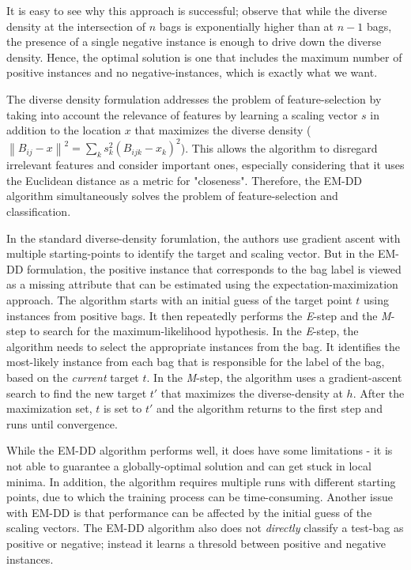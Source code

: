 \documentclass[conference]{IEEEtran}
\begin{document}
It is easy to see why this approach is successful; observe that while the diverse density at the intersection of $n$ bags is exponentially higher than at $n - 1$ bags, the presence of a single negative instance is enough to drive down the diverse density. Hence, the optimal solution is one that includes the maximum number of positive instances and no negative-instances, which is exactly what we want.

The diverse density formulation addresses the problem of feature-selection by taking into account the relevance of features by learning a scaling vector $s$ in addition to the location $x$ that maximizes the diverse density ($\left\| B_{ij} - x \right\|^2 = \sum_k s_k^2(B_{ijk} - x_k)^2$). This allows the algorithm to disregard irrelevant features and consider important ones, especially considering that it uses the Euclidean distance as a metric for "closeness". Therefore, the EM-DD algorithm simultaneously solves the problem of feature-selection and classification. 

In the standard diverse-density forumlation, the authors use gradient ascent with multiple starting-points to identify the target and scaling vector. But in the EM-DD formulation, the positive instance that corresponds to the bag label is viewed as a missing attribute that can be estimated using the expectation-maximization approach\cite{zhang2001dd}. The algorithm starts with an initial guess of the target point $t$ using instances from positive bags. It then repeatedly performs the \textit{E}-step and the \textit{M}-step to search for the maximum-likelihood hypothesis. In the \textit{E}-step, the algorithm needs to select the appropriate instances from the bag. It identifies the most-likely instance from each bag that is responsible for the label of the bag, based on the \textit{current} target $t$. In the \textit{M}-step, the algorithm uses a gradient-ascent search to find the new target $t'$ that maximizes the diverse-density at $h$. After the maximization set, $t$ is set to $t'$ and the algorithm returns to the first step and runs until convergence.

While the EM-DD algorithm performs well, it does have some limitations - it is not able to guarantee a globally-optimal solution and can get stuck in local minima. In addition, the algorithm requires multiple runs with different starting points, due to which the training process can be time-consuming. Another issue with EM-DD is that performance can be affected by the initial guess of the scaling vectors\cite{cholleti2006mi}. The EM-DD algorithm also does not \textit{directly} classify a test-bag as positive or negative; instead it learns a thresold between positive and negative instances\cite{cholleti2006mi}.
\end{document}
